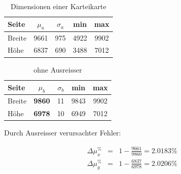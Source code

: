 \vspace*{-1.5cm}

\begin{center}
\begin{minipage}[t]{0.45\textwidth}

\begin{center}
\begin{table}[H]
\centering
\begin{scriptsize}
\begin{tabular}{lcccc}
\toprule
Seite &  $\mu_a$ &  $\sigma_a$ &  min &  max \\
\midrule
Breite	&    9661  &		975 &     4922 &     9902 \\
Höhe 	&    6837  &		690 &     3488 &     7012 \\
\bottomrule
\end{tabular}
\caption{Dimensionen einer Karteikarte}
\end{scriptsize}
\end{table}
\end{center}

\end{minipage}
\begin{minipage}[t]{0.45\textwidth}

\begin{center}
\begin{table}[H]
\centering
\begin{scriptsize}
\begin{tabular}{lcccc}
\toprule
Seite &  $\mu_b$ &  $\sigma_b$ &  min &  max \\
\midrule
Breite	&    \textbf{9860} &		11 & 9843 & 9902 \\
Höhe	&    \textbf{6978} &		10 & 6949 & 7012 \\
\bottomrule
\end{tabular}
\caption{ohne Ausreisser}
\end{scriptsize}
\end{table}
\end{center}

\end{minipage}
\end{center}

\vspace*{-0.3cm}
Durch Ausreisser verursachter Fehler:


\begin{footnotesize}
\begin{eqnarray*}
\Delta\mu_{x}^\% &=& 1 - \frac{9661}{9860} = 2.0183 \%\\
\Delta\mu_{y}^\% &=& 1 - \frac{6837}{6978} = 2.0206 \%
\end{eqnarray*}
\end{footnotesize}


